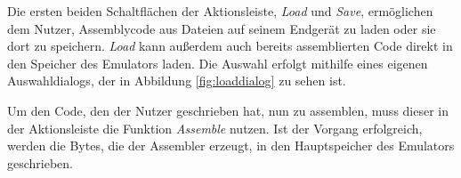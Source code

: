 Die ersten beiden Schaltflächen der Aktionsleiste, \textit{Load} und \textit{Save}, ermöglichen dem Nutzer, Assemblycode aus Dateien auf seinem Endgerät zu laden oder sie dort zu speichern. \textit{Load} kann außerdem auch bereits assemblierten Code direkt in den Speicher des Emulators laden. Die Auswahl erfolgt mithilfe eines eigenen Auswahldialogs, der in Abbildung \ref{fig:loaddialog} zu sehen ist.

Um den Code, den der Nutzer geschrieben hat, nun zu assemblen, muss dieser in der Aktionsleiste die Funktion \textit{Assemble} nutzen. Ist der Vorgang erfolgreich, werden die Bytes, die der Assembler erzeugt, in den Hauptspeicher des Emulators geschrieben.